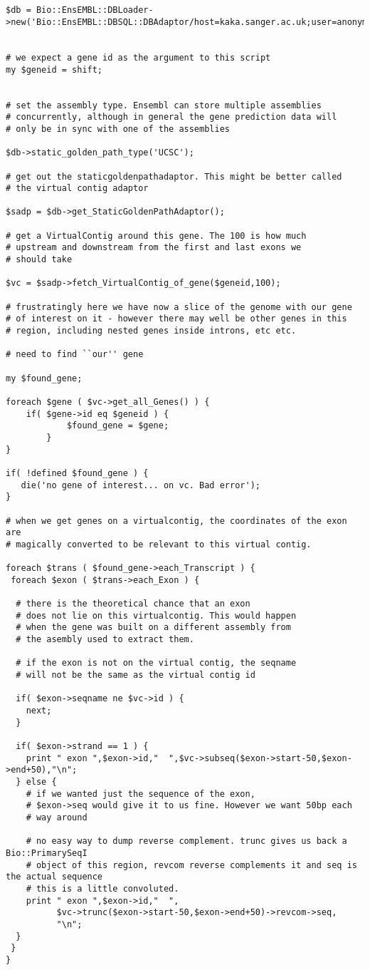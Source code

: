 \documentclass[11pt,a4paper]{article}
\begin{document}
\begin{verbatim}


$db = Bio::EnsEMBL::DBLoader->new('Bio::EnsEMBL::DBSQL::DBAdaptor/host=kaka.sanger.ac.uk;user=anonymous;dbname=current');


# we expect a gene id as the argument to this script
my $geneid = shift;


# set the assembly type. Ensembl can store multiple assemblies
# concurrently, although in general the gene prediction data will
# only be in sync with one of the assemblies

$db->static_golden_path_type('UCSC');

# get out the staticgoldenpathadaptor. This might be better called
# the virtual contig adaptor

$sadp = $db->get_StaticGoldenPathAdaptor();

# get a VirtualContig around this gene. The 100 is how much
# upstream and downstream from the first and last exons we
# should take

$vc = $sadp->fetch_VirtualContig_of_gene($geneid,100);

# frustratingly here we have now a slice of the genome with our gene
# of interest on it - however there may well be other genes in this
# region, including nested genes inside introns, etc etc.

# need to find ``our'' gene

my $found_gene;

foreach $gene ( $vc->get_all_Genes() ) {
	if( $gene->id eq $geneid ) {
            $found_gene = $gene;
        }
}

if( !defined $found_gene ) {
   die('no gene of interest... on vc. Bad error');
}

# when we get genes on a virtualcontig, the coordinates of the exon are
# magically converted to be relevant to this virtual contig.

foreach $trans ( $found_gene->each_Transcript ) {
 foreach $exon ( $trans->each_Exon ) {

  # there is the theoretical chance that an exon
  # does not lie on this virtualcontig. This would happen
  # when the gene was built on a different assembly from
  # the asembly used to extract them.

  # if the exon is not on the virtual contig, the seqname
  # will not be the same as the virtual contig id

  if( $exon->seqname ne $vc->id ) {
    next;
  }

  if( $exon->strand == 1 ) {
    print " exon ",$exon->id,"  ",$vc->subseq($exon->start-50,$exon->end+50),"\n";
  } else {
    # if we wanted just the sequence of the exon, 
    # $exon->seq would give it to us fine. However we want 50bp each
    # way around

    # no easy way to dump reverse complement. trunc gives us back a Bio::PrimarySeqI
    # object of this region, revcom reverse complements it and seq is the actual sequence
    # this is a little convoluted. 
    print " exon ",$exon->id,"  ",
          $vc->trunc($exon->start-50,$exon->end+50)->revcom->seq,
          "\n";
  }
 }
}

\end{verbatim}
\end{document}
